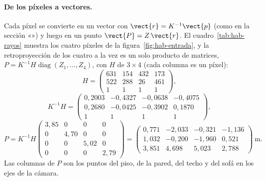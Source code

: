\paragraph{De los píxeles a vectores.} Cada píxel se convierte en un vector con $\vect{r}=K^{-1}\vect{p}$ (como en la
sección «») y luego en un punto $\vect{P}=Z\,\vect{r}$. El cuadro~\ref{tab:hab-rayos} muestra los cuatro píxeles de la figura~\ref{fig:hab-entrada},
y la retroproyección de los cuatro a la vez es un solo producto de matrices, $P=K^{-1}H\operatorname{diag}(Z_1,\dots,Z_4)$, con $H$ de $3\times4$ (cada
columna es un píxel):
\begin{equation}
H=\begin{pmatrix} 631 & 154 & 432 & 173 \\ 522 & 288 & 26 & 461 \\ 1 & 1 & 1 & 1 \end{pmatrix},
\end{equation}
\begin{equation}
K^{-1}H=\begin{pmatrix} 0{,}2003 & -0{,}4327 & -0{,}0638 & -0{,}4075 \\ 0{,}2680 & -0{,}0425 & -0{,}3902 & 0{,}1870 \\ 1 & 1 & 1 & 1 \end{pmatrix},
\end{equation}
\begin{equation}
P=K^{-1}H\begin{pmatrix}3{,}85&0&0&0\\0&4{,}70&0&0\\0&0&5{,}02&0\\0&0&0&2{,}79\end{pmatrix}=\begin{pmatrix} 0{,}771 & -2{,}033 & -0{,}321 & -1{,}136 \\ 1{,}032 & -0{,}200 & -1{,}960 & 0{,}521 \\ 3{,}851 & 4{,}698 & 5{,}023 & 2{,}788 \end{pmatrix}\ \text{m} .
\end{equation}
Las columnas de $P$ son los puntos del piso, de la pared, del techo y del sofá en los ejes de la cámara.

